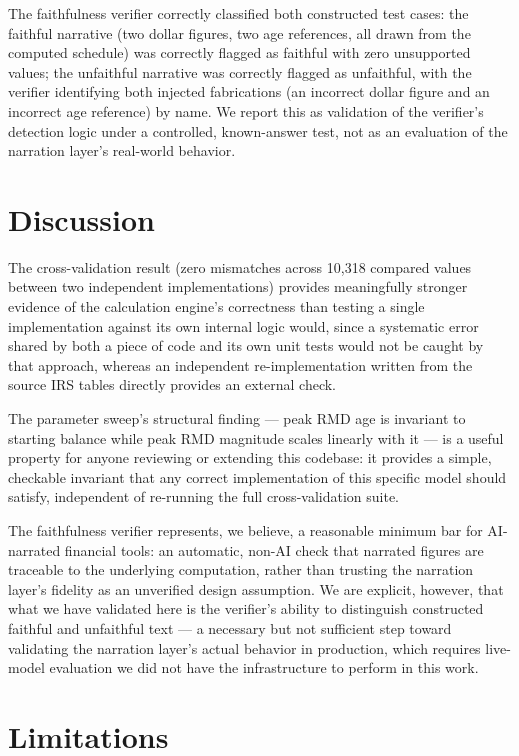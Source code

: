 \documentclass[11pt]{article}
\begin{document}
The faithfulness verifier correctly classified both constructed test
cases: the faithful narrative (two dollar figures, two age references,
all drawn from the computed schedule) was correctly flagged as faithful
with zero unsupported values; the unfaithful narrative was correctly
flagged as unfaithful, with the verifier identifying both injected
fabrications (an incorrect dollar figure and an incorrect age reference)
by name. We report this as validation of the verifier's detection logic
under a controlled, known-answer test, not as an evaluation of the
narration layer's real-world behavior.

\section{Discussion}

The cross-validation result (zero mismatches across 10,318 compared
values between two independent implementations) provides meaningfully
stronger evidence of the calculation engine's correctness than testing a
single implementation against its own internal logic would, since a
systematic error shared by both a piece of code and its own unit tests
would not be caught by that approach, whereas an independent
re-implementation written from the source IRS tables directly provides
an external check.

The parameter sweep's structural finding — peak RMD age is invariant to
starting balance while peak RMD magnitude scales linearly with it — is a
useful property for anyone reviewing or extending this codebase: it
provides a simple, checkable invariant that any correct implementation
of this specific model should satisfy, independent of re-running the
full cross-validation suite.

The faithfulness verifier represents, we believe, a reasonable minimum
bar for AI-narrated financial tools: an automatic, non-AI check that
narrated figures are traceable to the underlying computation, rather
than trusting the narration layer's fidelity as an unverified design
assumption. We are explicit, however, that what we have validated here
is the verifier's ability to distinguish constructed faithful and
unfaithful text — a necessary but not sufficient step toward validating
the narration layer's actual behavior in production, which requires
live-model evaluation we did not have the infrastructure to perform in
this work.

\section{Limitations}
\end{document}
